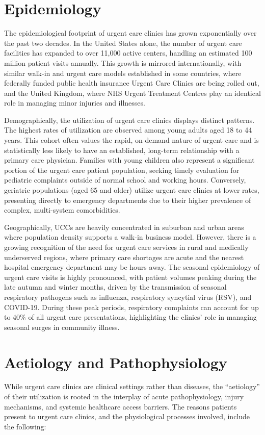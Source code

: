 \section*{Epidemiology}
The epidemiological footprint of urgent care clinics has grown exponentially over the past two decades. In the United States alone, the number of urgent care facilities has expanded to over 11,000 active centers, handling an estimated 100 million patient visits annually. This growth is mirrored internationally, with similar walk-in and urgent care models established in some countries, where federally funded public health insurance Urgent Care Clinics are being rolled out, and the United Kingdom, where NHS Urgent Treatment Centres play an identical role in managing minor injuries and illnesses.

Demographically, the utilization of urgent care clinics displays distinct patterns. The highest rates of utilization are observed among young adults aged 18 to 44 years. This cohort often values the rapid, on-demand nature of urgent care and is statistically less likely to have an established, long-term relationship with a primary care physician. Families with young children also represent a significant portion of the urgent care patient population, seeking timely evaluation for pediatric complaints outside of normal school and working hours. Conversely, geriatric populations (aged 65 and older) utilize urgent care clinics at lower rates, presenting directly to emergency departments due to their higher prevalence of complex, multi-system comorbidities.

Geographically, UCCs are heavily concentrated in suburban and urban areas where population density supports a walk-in business model. However, there is a growing recognition of the need for urgent care services in rural and medically underserved regions, where primary care shortages are acute and the nearest hospital emergency department may be hours away. The seasonal epidemiology of urgent care visits is highly pronounced, with patient volumes peaking during the late autumn and winter months, driven by the transmission of seasonal respiratory pathogens such as influenza, respiratory syncytial virus (RSV), and COVID-19. During these peak periods, respiratory complaints can account for up to 40\% of all urgent care presentations, highlighting the clinics' role in managing seasonal surges in community illness.

\section*{Aetiology and Pathophysiology}
While urgent care clinics are clinical settings rather than diseases, the ``aetiology'' of their utilization is rooted in the interplay of acute pathophysiology, injury mechanisms, and systemic healthcare access barriers. The reasons patients present to urgent care clinics, and the physiological processes involved, include the following:

